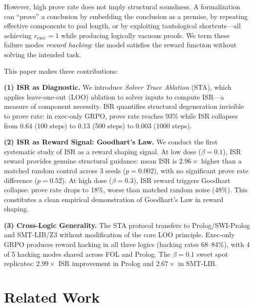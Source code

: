 \documentclass[11pt,twocolumn]{article}
\newcommand{\isr}{\textsc{ISR}}
\newcommand{\sta}{\textsc{STA}}
\newcommand{\grpo}{\textsc{GRPO}}
\begin{document}
However, high prove rate does not imply structural soundness.
A formalization can ``prove'' a conclusion by embedding the conclusion as a premise, by repeating effective components to pad length, or by exploiting tautological shortcuts---all achieving $r_{\text{exec}}{=}1$ while producing logically vacuous proofs.
We term these failure modes \emph{reward hacking}: the model satisfies the reward function without solving the intended task.

This paper makes three contributions:

\textbf{(1) ISR as Diagnostic.}
We introduce \emph{Solver Trace Ablation} (\sta{}), which applies leave-one-out (LOO) ablation to solver inputs to compute \isr{}---a measure of component necessity.
\isr{} quantifies structural degeneration invisible to prove rate: in exec-only \grpo{}, prove rate reaches 93\% while \isr{} collapses from 0.64 (100 steps) to 0.13 (500 steps) to 0.003 (1000 steps).

\textbf{(2) ISR as Reward Signal: Goodhart's Law.}
We conduct the first systematic study of \isr{} as a reward shaping signal.
At low dose ($\beta{=}0.1$), \isr{} reward provides genuine structural guidance: mean \isr{} is $2.96\times$ higher than a matched random control across 3 seeds ($p{=}0.002$), with no significant prove rate difference ($p{=}0.52$).
At high dose ($\beta{=}0.3$), \isr{} reward triggers Goodhart collapse: prove rate drops to 18\%, worse than matched random noise (48\%).
This constitutes a clean empirical demonstration of Goodhart's Law in reward shaping.

\textbf{(3) Cross-Logic Generality.}
The \sta{} protocol transfers to Prolog/SWI-Prolog and SMT-LIB/Z3 without modification of the core LOO principle.
Exec-only \grpo{} produces reward hacking in all three logics (hacking rates 68--84\%), with 4 of 5 hacking modes shared across FOL and Prolog.
The $\beta{=}0.1$ sweet spot replicates: $2.99\times$ \isr{} improvement in Prolog and $2.67\times$ in SMT-LIB.

\section{Related Work}
\label{sec:related}
\end{document}
